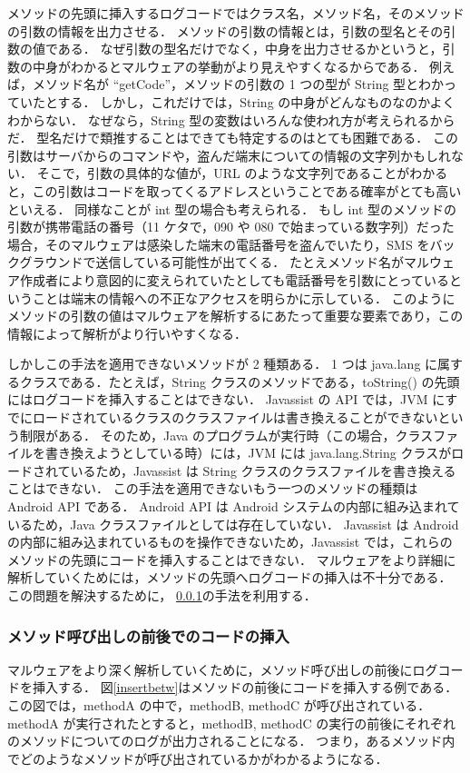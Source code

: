 メソッドの先頭に挿入するログコードではクラス名，メソッド名，そのメソッドの引数の情報を出力させる．
メソッドの引数の情報とは，引数の型名とその引数の値である．
なぜ引数の型名だけでなく，中身を出力させるかというと，引数の中身がわかるとマルウェアの挙動がより見えやすくなるからである．
例えば，メソッド名が ``getCode''，メソッドの引数の 1 つの型が String 型とわかっていたとする．
しかし，これだけでは，String の中身がどんなものなのかよくわからない．
なぜなら，String 型の変数はいろんな使われ方が考えられるからだ．
型名だけで類推することはできても特定するのはとても困難である．
この引数はサーバからのコマンドや，盗んだ端末についての情報の文字列かもしれない．
そこで，引数の具体的な値が，URL のような文字列であることがわかると，この引数はコードを取ってくるアドレスということである確率がとても高いといえる．
同様なことが int 型の場合も考えられる．
もし int 型のメソッドの引数が携帯電話の番号（11 ケタで，090 や 080 で始まっている数字列）だった場合，そのマルウェアは感染した端末の電話番号を盗んでいたり，SMS をバックグラウンドで送信している可能性が出てくる．
たとえメソッド名がマルウェア作成者により意図的に変えられていたとしても電話番号を引数にとっているということは端末の情報への不正なアクセスを明らかに示している．
このようにメソッドの引数の値はマルウェアを解析するにあたって重要な要素であり，この情報によって解析がより行いやすくなる．

しかしこの手法を適用できないメソッドが 2 種類ある．
1 つは java.lang に属するクラスである．たとえば，String クラスのメソッドである，toString() の先頭にはログコードを挿入することはできない．
Javassist の API では，JVM にすでにロードされているクラスのクラスファイルは書き換えることができないという制限がある．
そのため，Java のプログラムが実行時（この場合，クラスファイルを書き換えようとしている時）には，JVM には java.lang.String クラスがロードされているため，Javassist は String  クラスのクラスファイルを書き換えることはできない．
この手法を適用できないもう一つのメソッドの種類は Android API である．
Android API は Android システムの内部に組み込まれているため，Java クラスファイルとしては存在していない．
Javassist は Android の内部に組み込まれているものを操作できないため，Javassist では，これらのメソッドの先頭にコードを挿入することはできない．
マルウェアをより詳細に解析していくためには，メソッドの先頭へログコードの挿入は不十分である．
この問題を解決するために， \ref{methodcalls}の手法を利用する．

\subsubsection{メソッド呼び出しの前後でのコードの挿入}
\label{methodcalls}
マルウェアをより深く解析していくために，メソッド呼び出しの前後にログコードを挿入する．
図\ref{insertbetw}はメソッドの前後にコードを挿入する例である．
この図では，methodA の中で，methodB, methodC が呼び出されている．methodA が実行されたとすると，methodB, methodC の実行の前後にそれぞれのメソッドについてのログが出力されることになる．
つまり，あるメソッド内でどのようなメソッドが呼び出されているかがわかるようになる．

